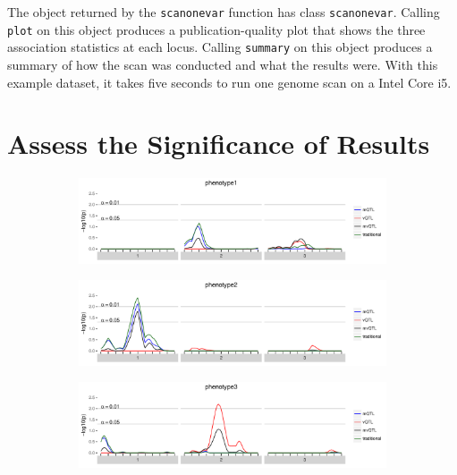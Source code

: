 \documentclass[9pt,twocolumn,twoside]{gsag3jnl}
\begin{document}
The object returned by the \texttt{scanonevar} function has class \texttt{scanonevar}.
Calling \texttt{plot} on this object produces a publication-quality plot that shows the three association statistics at each locus.
Calling \texttt{summary} on this object produces a summary of how the scan was conducted and what the results were.
With this example dataset, it takes five seconds to run one genome scan on a Intel Core i5.




\section*{Assess the Significance of Results}

\begin{figure}[t]
    \begin{subfigure}[b]{\linewidth}
        \includegraphics[width=\textwidth]{images/empir_p_scan_phenotype1.pdf}
    \end{subfigure}

    \begin{subfigure}[b]{\linewidth}
        \includegraphics[width=\textwidth]{images/empir_p_scan_phenotype2.pdf}
    \end{subfigure}

    \begin{subfigure}[b]{\linewidth}
        \includegraphics[width=\textwidth]{images/empir_p_scan_phenotype3.pdf}
    \end{subfigure}


\end{figure}
\end{document}
